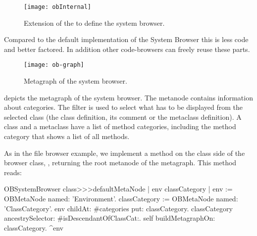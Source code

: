 \documentclass[a4paper,10pt,twoside]{book}
\begin{document}




\begin{figure}[!ht]
\begin{center}
\texttt{[image: obInternal]}
\caption{Extension of the \obf to define the system browser.} 
\end{center}
\end{figure}


Compared to the default implementation of the \pharo System Browser this is less code and better factored. In addition other code-browsers can freely reuse these parts.

\begin{figure}[!ht]
\begin{center}
\texttt{[image: ob-graph]}
\caption{Metagraph of the system browser.} 
\end{center}
\end{figure}

 depicts the metagraph of the system browser. The metanode  contains information about categories. The filter is used to select what has to be displayed from the selected class (\ie the class definition, its comment or the metaclass definition). A class and a metaclass have a list of method categories, including the  method category that shows a list of all methods.

As in the file browser example, we implement a method  on the class side of the browser class, \ie {}, returning the root metanode of the metagraph. This method reads:
\begin{code}{}
OBSystemBrowser class>>>defaultMetaNode
	| env classCategory |
	env := OBMetaNode named: 'Environment'.
	classCategory := OBMetaNode named: 'ClassCategory'.
	env childAt: #categories put: classCategory.
	classCategory ancestrySelector: #isDescendantOfClassCat:.
	self buildMetagraphOn: classCategory.
	^env
\end{code}
\end{document}
